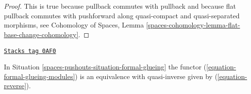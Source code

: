 \begin{proof}
This is true because pullback commutes with pullback and because
flat pullback commutes with pushforward along quasi-compact
and quasi-separated morphisms, see
Cohomology of Spaces, Lemma
\ref{spaces-cohomology-lemma-flat-base-change-cohomology}.
\end{proof}

\begin{proposition}
\label{spaces-pushouts-proposition-formal-glueing-modules}
\href{https://stacks.math.columbia.edu/tag/0AF0}{\texttt{Stacks tag 0AF0}}

In Situation \ref{spaces-pushouts-situation-formal-glueing} the functor
(\ref{equation-formal-glueing-modules}) is an equivalence
with quasi-inverse given by (\ref{equation-reverse}).
\end{proposition}

